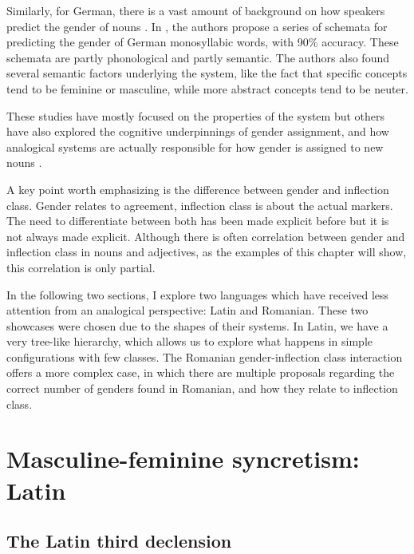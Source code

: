 Similarly, for German, there is a vast amount of background on how speakers predict the gender of nouns  \autocites{Hahn.2000, Kopcke.1984, Kopcke.2010, Zubin.1985, Salmons.1993, Schwichtenberg.2004, Zubin.1986, Zubin.1984}. In \textcite{Kopcke.1984}, the authors propose a series of schemata for predicting the gender of German monosyllabic words, with 90\% accuracy. These schemata are partly phonological and partly semantic. The authors also found several semantic factors underlying the system, like the fact that specific concepts tend to be feminine or masculine, while more abstract concepts tend to be neuter.

These studies have mostly focused on the properties of the system but others have also explored the cognitive underpinnings of gender assignment, and how analogical systems are actually responsible for how gender is assigned to new nouns \autocites{Holmes.2004, Caffarra.2015, Caffarra.2015a, Taylor.2012}.

A key point worth emphasizing is the difference between gender and inflection class. Gender relates to agreement, inflection class is about the actual markers. The need to differentiate between both has been made explicit before \autocite{Aronoff.1994, Harris.1991} but it is not always made explicit. Although there is often correlation between gender and inflection class in nouns and adjectives, as the examples of this chapter will show, this correlation is only partial.

In the following two sections, I explore two languages which have received less attention from an analogical perspective: Latin and Romanian. These two showcases were chosen due to the shapes of their systems. In Latin, we have a very tree-like hierarchy, which allows us to explore what happens in simple configurations with few classes. The Romanian gender-inflection class interaction offers a more complex case, in which there are multiple proposals regarding the correct number of genders found in Romanian, and how they relate to inflection class.

\newpage
\section{Masculine-feminine syncretism: Latin}

\subsection{The Latin third declension}

